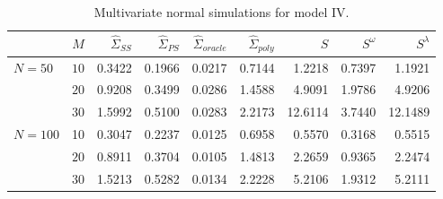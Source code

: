 \begin{table}[H]
\centering
\caption{Multivariate normal simulations for model IV.}
\begin{tabular}{lrrrrrrrr}
 & $M$ &$\hat{\Sigma}_{SS}$& $\hat{\Sigma}_{PS}$ &$\hat{\Sigma}_{oracle}$& $\hat{\Sigma}_{poly}$ & $S$ &$S^\omega$& $S^\lambda$ \\ 
  \hline
 $N = 50$ & $10$ & 0.3422 & 0.1966 & 0.0217 & 0.7144 & 1.2218 & 0.7397 & 1.1921 \\ 
   & $20$ & 0.9208 & 0.3499 & 0.0286 & 1.4588 & 4.9091 & 1.9786 & 4.9206 \\ 
       & $30$ & 1.5992 & 0.5100 & 0.0283 & 2.2173 & 12.6114 & 3.7440 & 12.1489 \\ 
     $N = 100$ & 10 & 0.3047 & 0.2237 & 0.0125 & 0.6958 & 0.5570 & 0.3168 & 0.5515 \\ 
       & $20$ & 0.8911 & 0.3704 & 0.0105 & 1.4813 & 2.2659 & 0.9365 & 2.2474 \\ 
       & $30$ & 1.5213 & 0.5282 & 0.0134 & 2.2228 & 5.2106 & 1.9312 & 5.2111 \\ 
   \hline
\end{tabular} 
\label{table:simulation-1-entropy-loss-sigma-4}
\end{table}
